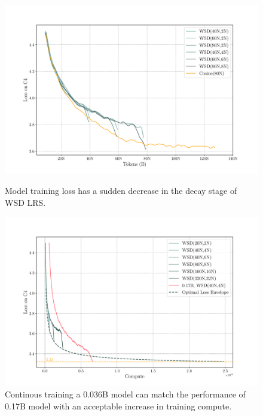 \begin{figure}[htbp]
    \centering
    \begin{minipage}{0.48\linewidth}
        \centering
        \includegraphics[width=1.05\linewidth]{Fig/WSD_diff_dcay.pdf}
        \caption{ Model training loss has a sudden decrease in the decay stage of WSD LRS. }
        \label{fig:wsd_diff_dcay}
        \vspace{0.47cm}
    \end{minipage}
    \hfill %
    \begin{minipage}{0.48\linewidth}
        \centering
    \includegraphics[width=1.05\linewidth]{Fig/continuous_train.pdf}
    \caption{Continous training a 0.036B model can match the performance of 0.17B model with an acceptable increase in training compute.}
    \label{fig:continuoustrain}
    \end{minipage}
\end{figure}

